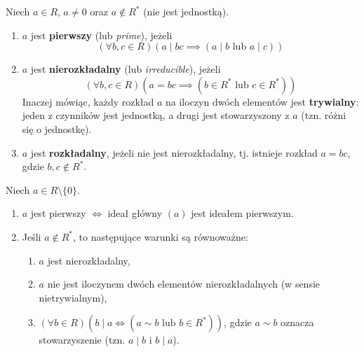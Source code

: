 \begin{definition}
Niech $a \in R$, $a \neq 0$ oraz $a \notin R^*$ (nie jest jednostką).
\begin{enumerate}[label=\arabic*)]
    \item $a$ jest \textbf{pierwszy} (lub \emph{prime}), jeżeli
    \[
    \left(\forall b,c \in R \right)\left( a \mid bc \implies \left( a \mid b \text{ lub } a \mid c \right)  \right)  
    \]
    \item $a$ jest \textbf{nierozkładalny} (lub \emph{irreducible}), jeżeli
    \[
    \left(\forall b,c \in R \right)\left( a = bc \implies \left( b \in R^{\ast} \text{ lub } c \in R^{\ast}  \right)  \right)  
    \]
    Inaczej mówiąc, każdy rozkład $a$ na iloczyn dwóch elementów jest \textbf{trywialny}: jeden z czynników jest jednostką, a drugi jest stowarzyszony z $a$ (tzn. różni się o jednostkę).
    \item $a$ jest \textbf{rozkładalny}, jeżeli nie jest nierozkładalny, tj. istnieje rozkład $a = bc$, gdzie $b, c \notin R^*$.
\end{enumerate}
\end{definition}

\begin{theorem}[Charakteryzacje]
Niech $a \in R \setminus \{0\}$.
\begin{enumerate}[label=\arabic*)]
    \item $a$ jest pierwszy $\iff$ ideał główny $(a)$ jest ideałem pierwszym.
    \item Jeśli $a \notin R^*$, to następujące warunki są równoważne:
    \begin{enumerate}[label=\roman*)]
        \item $a$ jest nierozkładalny,
        \item $a$ nie jest iloczynem dwóch elementów nierozkładalnych (w sensie nietrywialnym),
	\item $\left(\forall b \in R \right)\left( b \mid a \iff \left( a \sim b \text{ lub } b \in R^{\ast}\right)\right)$,
          gdzie $a \sim b$ oznacza stowarzyszenie (tzn. $a \mid b$ i $b \mid a$).
    \end{enumerate}
\end{enumerate}
\end{theorem}

